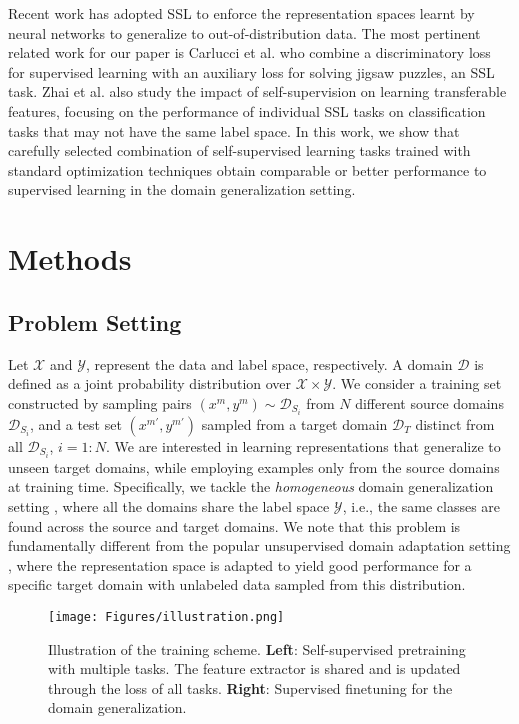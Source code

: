 \documentclass[runningheads]{llncs}
\begin{document}
Recent work has adopted SSL to enforce the representation spaces learnt by neural networks to generalize to out-of-distribution data. The most pertinent related work for our paper is Carlucci et al. \cite{carlucci2019domain} who combine a discriminatory loss for supervised learning with an auxiliary loss for solving jigsaw puzzles, an SSL task. Zhai et al. \cite{zhai2019visual} also study the impact of self-supervision on learning transferable features, focusing on the performance of individual SSL tasks on classification tasks that may not have the same label space.  In this work, we show that carefully selected combination of self-supervised learning tasks trained with standard optimization techniques obtain comparable or better performance to supervised learning in the domain generalization setting. 


\section{Methods}
\subsection{Problem Setting}
Let $\mathcal{X}$ and $\mathcal{Y}$, represent the data and label space, respectively. A domain $\mathcal{D}$ is defined as a joint probability distribution over $\mathcal{X} \times \mathcal{Y}$. We consider  a training set constructed by sampling pairs $(x^m, y^m) \sim \mathcal{D}_{S_i}$ from $N$ different source domains $\mathcal{D}_{S_i}$, and a test set $(x^{m'}, y^{m'})$ sampled from a target domain $\mathcal{D}_T$ distinct from all $\mathcal{D}_{S_i}$, $i=1:N$. We are interested in learning representations that generalize to unseen target domains, while employing examples only from the source domains at training time. Specifically, we tackle the \textit{homogeneous} domain generalization setting \cite{li2019episodic}, where all the domains share the label space $\mathcal{Y}$, i.e., the same classes are found across the source and target domains.  We note that this problem is fundamentally different from the popular unsupervised domain adaptation setting \cite{ben2010theory}, where the representation space is adapted to yield good performance for a specific target domain with unlabeled data sampled from this distribution.

\begin{figure}[t]
    \centering
    \texttt{[image: Figures/illustration.png]}
    \caption{Illustration of the training scheme. \textbf{Left}: Self-supervised pretraining with multiple tasks.  The feature extractor is shared and is updated through the loss of all tasks. \textbf{Right}: Supervised finetuning for the domain generalization.}
    \label{fig:approach}
\end{figure}
\end{document}
